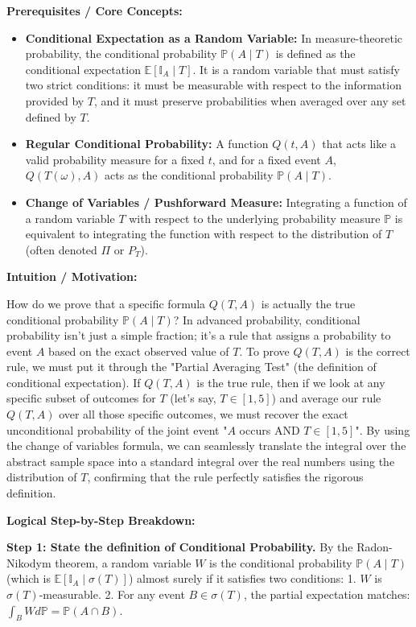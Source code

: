 \begin{solution}
\textbf{Prerequisites / Core Concepts:}
\begin{itemize}
    \item \textbf{Conditional Expectation as a Random Variable:} In measure-theoretic probability, the conditional probability $\mathbb{P}(A \mid T)$ is defined as the conditional expectation $\mathbb{E}[\mathbb{I}_A \mid T]$. It is a random variable that must satisfy two strict conditions: it must be measurable with respect to the information provided by $T$, and it must preserve probabilities when averaged over any set defined by $T$.
    \item \textbf{Regular Conditional Probability:} A function $Q(t, A)$ that acts like a valid probability measure for a fixed $t$, and for a fixed event $A$, $Q(T(\omega), A)$ acts as the conditional probability $\mathbb{P}(A \mid T)$.
    \item \textbf{Change of Variables / Pushforward Measure:} Integrating a function of a random variable $T$ with respect to the underlying probability measure $\mathbb{P}$ is equivalent to integrating the function with respect to the distribution of $T$ (often denoted $\Pi$ or $P_T$).
\end{itemize}

\textbf{Intuition / Motivation:}

How do we prove that a specific formula $Q(T,A)$ is actually the true conditional probability $\mathbb{P}(A \mid T)$?
In advanced probability, conditional probability isn't just a simple fraction; it's a rule that assigns a probability to event $A$ based on the exact observed value of $T$.
To prove $Q(T,A)$ is the correct rule, we must put it through the "Partial Averaging Test" (the definition of conditional expectation).
If $Q(T,A)$ is the true rule, then if we look at any specific subset of outcomes for $T$ (let's say, $T \in [1, 5]$) and average our rule $Q(T,A)$ over all those specific outcomes, we must recover the exact unconditional probability of the joint event "$A$ occurs AND $T \in [1, 5]$".
By using the change of variables formula, we can seamlessly translate the integral over the abstract sample space into a standard integral over the real numbers using the distribution of $T$, confirming that the rule perfectly satisfies the rigorous definition.

\textbf{Logical Step-by-Step Breakdown:}

\textbf{Step 1: State the definition of Conditional Probability.}
By the Radon-Nikodym theorem, a random variable $W$ is the conditional probability $\mathbb{P}(A \mid T)$ (which is $\mathbb{E}[\mathbb{I}_A \mid \sigma(T)]$) almost surely if it satisfies two conditions:
1. $W$ is $\sigma(T)$-measurable.
2. For any event $B \in \sigma(T)$, the partial expectation matches: $\int_B W d\mathbb{P} = \mathbb{P}(A \cap B)$.


\end{solution}
